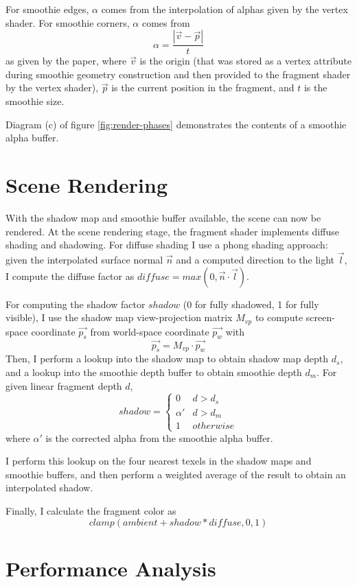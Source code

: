 \documentclass[sigconf]{acmart}
\begin{document}
For smoothie edges, $\alpha$ comes from the interpolation of alphas given by the vertex shader. For smoothie corners, $\alpha$ comes from \[ \alpha = \frac{|\vec{v} - \vec{p}|}{t} \] as given by the paper, where $\vec{v}$ is the origin (that was stored as a vertex attribute during smoothie geometry construction and then provided to the fragment shader by the vertex shader), $\vec{p}$ is the current position in the fragment, and $t$ is the smoothie size.

Diagram (c) of figure \ref{fig:render-phases} demonstrates the contents of a smoothie alpha buffer.

\section{Scene Rendering}

With the shadow map and smoothie buffer available, the scene can now be rendered. At the scene rendering stage, the fragment shader implements diffuse shading and shadowing. For diffuse shading I use a phong shading approach: given the interpolated surface normal $\vec{n}$ and a computed direction to the light $\vec{l}$, I compute the diffuse factor as $\mathit{diffuse} = \mathit{max}(0, \vec{n} \cdot \vec{l})$. 

For computing the shadow factor $\mathit{shadow}$ (0 for fully shadowed, 1 for fully visible), I use the shadow map view-projection matrix $M_\mathit{vp}$ to compute screen-space coordinate $\vec{p_s}$ from world-space coordinate $\vec{p_w}$ with \[ \vec{p_s} = M_\mathit{vp} \cdot \vec{p_w} \] Then, I perform a lookup into the shadow map to obtain shadow map depth $d_s$, and a lookup into the smoothie depth buffer to obtain smoothie depth $d_m$. For given linear fragment depth $d$, \[ 
\mathit{shadow} = \begin{cases}
    0 & d > d_s \\
    \alpha' & d > d_m \\
    1 & \mathit{otherwise}
\end{cases}
\] where $\alpha'$ is the corrected alpha from the smoothie alpha buffer. 

I perform this lookup on the four nearest texels in the shadow maps and smoothie buffers, and then perform a weighted average of the result to obtain an interpolated shadow. 

Finally, I calculate the fragment color as \[ \mathit{clamp}(\mathit{ambient} + \mathit{shadow} * \mathit{diffuse}, 0, 1) \]

\section{Performance Analysis}
\end{document}
